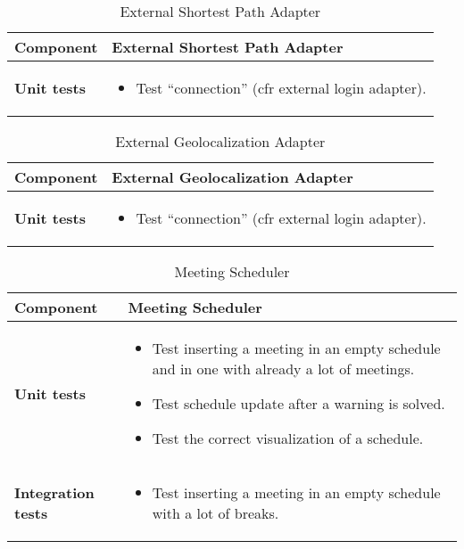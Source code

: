 \begin{table}[h]	
	\centering
	\def\arraystretch{1.5}
	\begin{tabular}{|m{4cm}|m{12cm}|}
		\hline
		\textbf{Component} & External Shortest Path Adapter \\ \hline
		\textbf{Unit tests} & 
			\begin{itemize}
			\item Test ``connection'' (cfr external login adapter).
			\end{itemize} \\ \hline
	\end{tabular}
	\caption{External Shortest Path Adapter}
\end{table}

\begin{table}[h]	
	\centering
	\def\arraystretch{1.5}
	\begin{tabular}{|m{4cm}|m{12cm}|}
		\hline
		\textbf{Component} & External Geolocalization Adapter \\ \hline
		\textbf{Unit tests} & 
			\begin{itemize}
			\item Test ``connection'' (cfr external login adapter).
			\end{itemize} \\ \hline
	\end{tabular}
	\caption{External Geolocalization Adapter}
\end{table}

\begin{table}[h]	
	\centering
	\def\arraystretch{1.5}
	\begin{tabular}{|m{4cm}|m{12cm}|}
		\hline
		\textbf{Component} & Meeting Scheduler \\ \hline
		\textbf{Unit tests} & 
			\begin{itemize}
			\item Test inserting a meeting in an empty schedule and in one with already a lot of meetings.
			\item Test schedule update after a warning is solved.
			\item Test the correct visualization of a schedule.
			\end{itemize} \\ \hline
		\textbf{Integration tests} & 
			\begin{itemize}
			\item Test inserting a meeting in an empty schedule with a lot of breaks.
			\end{itemize} \\ \hline
	\end{tabular}
	\caption{Meeting Scheduler}
\end{table}

